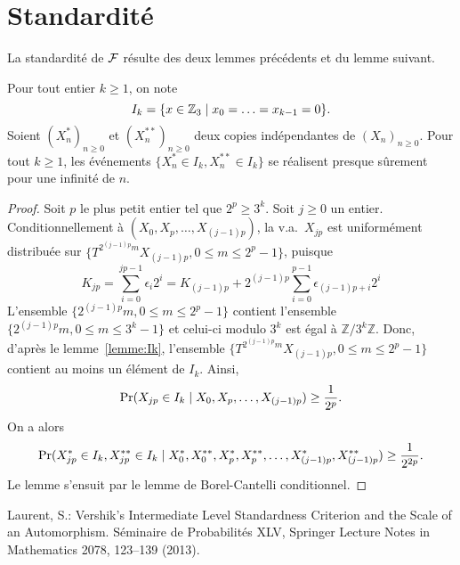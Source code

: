 \documentclass[12pt,a4paper]{article}
\begin{document}
\section{Standardité}

La standardité de $\mathcal{F}$ résulte des deux lemmes précédents et du lemme suivant.

\begin{lemme}
Pour tout entier $k \geq 1$, on note
$$
I_k = \{x \in \mathbb{Z}_3 \mid x_0=\ldots=x_{k-1}=0\}.
$$
Soient ${(X^\ast_n)}_{n \geq 0}$ et ${(X^{\ast\ast}_n)}_{n \geq 0}$ deux copies indépendantes 
de ${(X_n)}_{n \geq 0}$. 
Pour tout $k \geq 1$, les événements $\{X^\ast_n \in I_k, X^{\ast\ast}_n \in I_k\}$ 
se réalisent presque sûrement pour une infinité de $n$.
\end{lemme}

\begin{proof}
Soit $p$ le plus petit entier tel que $2^p \geq 3^k$. 
Soit $j \geq 0$ un entier. 
Conditionnellement à $(X_0, X_p, \ldots, X_{(j-1)p})$, 
la v.a.\ $X_{jp}$ est uniformément distribuée sur 
$\{T^{2^{(j-1)p}m}X_{(j-1)p}, 0 \leq m \leq 2^p-1\}$, 
puisque
$$
K_{jp} = \sum_{i=0}^{jp-1} \epsilon_i2^{i} 
 = K_{(j-1)p} + 2^{(j-1)p}\sum_{i=0}^{p-1}\epsilon_{(j-1)p+i}2^i
$$
L'ensemble $\{2^{(j-1)p}m, 0 \leq m \leq 2^p-1\}$ contient l'ensemble 
$\{2^{(j-1)p}m, 0 \leq m \leq 3^k-1\}$ et celui-ci modulo $3^k$ est égal à $\mathbb{Z}/3^k\mathbb{Z}$. 
Donc, d'après le lemme~\ref{lemme:Ik}, 
l'ensemble $\{T^{2^{(j-1)p}m}X_{(j-1)p}, 0 \leq m \leq 2^p-1\}$ 
contient au moins un élément de $I_k$. 
Ainsi, 
$$
\Pr(X_{jp} \in I_k \mid X_0, X_p, \ldots, X_{(j-1)p}) 
\geq \frac{1}{2^p}.
$$
On a alors 
$$
\Pr(X^\ast_{jp} \in I_k, X^{\ast\ast}_{jp} \in I_k \mid 
X^\ast_0, X^{\ast\ast}_0, X^\ast_p, X^{\ast\ast}_p, \ldots, X^\ast_{(j-1)p}, X^{\ast\ast}_{(j-1)p}) 
\geq \frac{1}{2^{2p}}.
$$
Le lemme s'ensuit par le lemme de Borel-Cantelli conditionnel.
\end{proof}



\begin{thebibliography}{99.}


Laurent, S.: 
Vershik's Intermediate Level Standardness Criterion and the Scale of an Automorphism. 
S\'eminaire de Probabilit\'es XLV,
Springer Lecture Notes in Mathematics 2078,
123--139 (2013).


\end{thebibliography}

 
\end{document}
